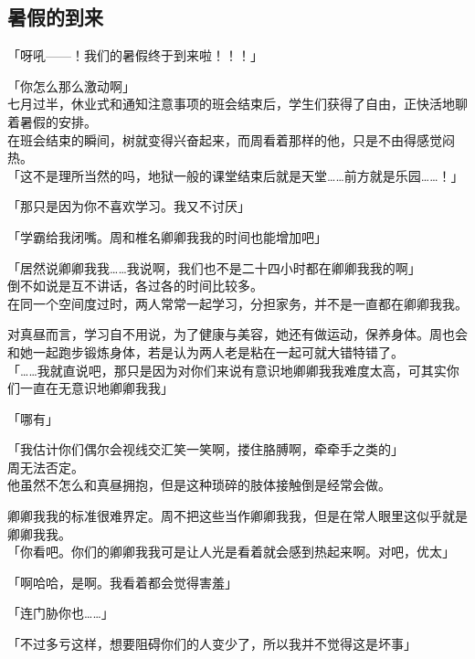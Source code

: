 \subsection{暑假的到来}

「呀吼——！我们的暑假终于到来啦！！！」

「你怎么那么激动啊」\\

七月过半，休业式和通知注意事项的班会结束后，学生们获得了自由，正快活地聊着暑假的安排。\\

在班会结束的瞬间，树就变得兴奋起来，而周看着那样的他，只是不由得感觉闷热。\\

「这不是理所当然的吗，地狱一般的课堂结束后就是天堂……前方就是乐园……！」

「那只是因为你不喜欢学习。我又不讨厌」

「学霸给我闭嘴。周和椎名卿卿我我的时间也能增加吧」

「居然说卿卿我我……我说啊，我们也不是二十四小时都在卿卿我我的啊」\\

倒不如说是互不讲话，各过各的时间比较多。\\

在同一个空间度过时，两人常常一起学习，分担家务，并不是一直都在卿卿我我。

对真昼而言，学习自不用说，为了健康与美容，她还有做运动，保养身体。周也会和她一起跑步锻炼身体，若是认为两人老是粘在一起可就大错特错了。\\

「……我就直说吧，那只是因为对你们来说有意识地卿卿我我难度太高，可其实你们一直在无意识地卿卿我我」

「哪有」

「我估计你们偶尔会视线交汇笑一笑啊，搂住胳膊啊，牵牵手之类的」\\

周无法否定。\\

他虽然不怎么和真昼拥抱，但是这种琐碎的肢体接触倒是经常会做。

卿卿我我的标准很难界定。周不把这些当作卿卿我我，但是在常人眼里这似乎就是卿卿我我。\\

「你看吧。你们的卿卿我我可是让人光是看着就会感到热起来啊。对吧，优太」

「啊哈哈，是啊。我看着都会觉得害羞」

「连门胁你也……」

「不过多亏这样，想要阻碍你们的人变少了，所以我并不觉得这是坏事」\\

